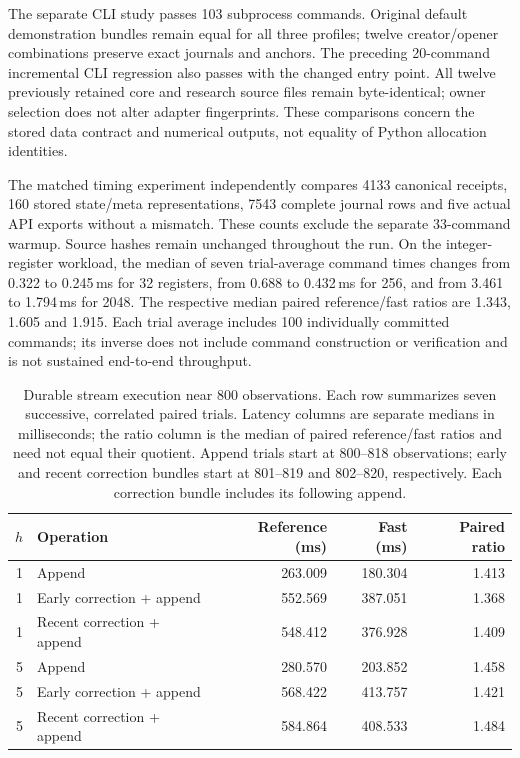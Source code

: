 \documentclass[11pt,a4paper]{article}
\theoremstyle{definition}\newtheorem{definition}[theorem]{Definition}
\begin{document}
The separate CLI study passes 103 subprocess commands. Original default demonstration bundles remain equal for all three profiles; twelve creator/opener combinations preserve exact journals and anchors. The preceding 20-command incremental CLI regression also passes with the changed entry point. All twelve previously retained core and research source files remain byte-identical; owner selection does not alter adapter fingerprints. These comparisons concern the stored data contract and numerical outputs, not equality of Python allocation identities.

The matched timing experiment independently compares 4133 canonical receipts, 160 stored state/meta representations, 7543 complete journal rows and five actual API exports without a mismatch. These counts exclude the separate 33-command warmup. Source hashes remain unchanged throughout the run. On the integer-register workload, the median of seven trial-average command times changes from 0.322 to 0.245\,ms for 32 registers, from 0.688 to 0.432\,ms for 256, and from 3.461 to 1.794\,ms for 2048. The respective median paired reference/fast ratios are 1.343, 1.605 and 1.915. Each trial average includes 100 individually committed commands; its inverse does not include command construction or verification and is not sustained end-to-end throughput.

\begin{table}[H]
\centering\small
\caption{Durable stream execution near 800 observations. Each row summarizes seven successive, correlated paired trials. Latency columns are separate medians in milliseconds; the ratio column is the median of paired reference/fast ratios and need not equal their quotient. Append trials start at 800--818 observations; early and recent correction bundles start at 801--819 and 802--820, respectively. Each correction bundle includes its following append.}\label{tab:fastowner}
\begin{tabular}{rlrrr}
\toprule
$h$ & Operation & Reference (ms) & Fast (ms) & Paired ratio\\
\midrule
1 & Append & 263.009 & 180.304 & 1.413\\
1 & Early correction + append & 552.569 & 387.051 & 1.368\\
1 & Recent correction + append & 548.412 & 376.928 & 1.409\\
5 & Append & 280.570 & 203.852 & 1.458\\
5 & Early correction + append & 568.422 & 413.757 & 1.421\\
5 & Recent correction + append & 584.864 & 408.533 & 1.484\\
\bottomrule
\end{tabular}
\end{table}
\end{document}
